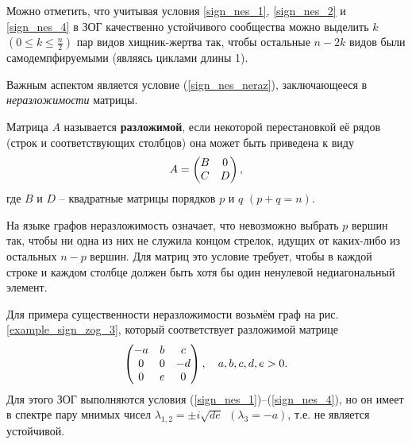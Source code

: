     Можно отметить, что учитывая условия \eqref{sign_nes_1}, \eqref{sign_nes_2} и \eqref{sign_nes_4} в ЗОГ качественно устойчивого сообщества можно выделить \(k\) \( \left( 0 \leq k \leq \frac{n}{2} \right)\) пар видов хищник-жертва так, чтобы остальные \(n - 2k\) видов были самодемпфируемыми (являясь циклами длины 1).

    Важным аспектом является условие (\ref{sign_nes_neraz}), заключающееся в \textit{неразложимости} матрицы. 

    \begin{definition}
        Матрица \(A\) называется \textbf{разложимой}, если некоторой перестановкой её рядов (строк и соответствующих столбцов) она может быть приведена к виду
        \begin{equation}
            A = \left(  \begin{matrix}
                B & 0 \\
                C & D
            \end{matrix}  \right),
        \end{equation}
        где \(B\) и \(D\) -- квадратные матрицы порядков \(p\) и \(q\) \((p+q = n)\).
    \end{definition}
    
    На языке графов неразложимость означает, что невозможно выбрать \(p\) вершин так, чтобы ни одна из них не служила концом стрелок, идущих от каких-либо из остальных \(n-p\) вершин. Для матриц это условие требует, чтобы в каждой строке и каждом столбце должен быть хотя бы один ненулевой недиагональный элемент.

    Для примера существенности неразложимости возьмём граф на рис. \ref{example_sign_zog_3}, который соответствует разложимой матрице
    \begin{equation}
        \left(  \begin{matrix}
            -a & b & c \\
            0 & 0 & -d \\
            0 & e & 0 
        \end{matrix}  \right), 
        \quad a, b, c, d, e > 0.
    \end{equation}
    Для этого ЗОГ выполняются условия (\ref{sign_nes_1})--(\ref{sign_nes_4}), но он имеет в спектре пару мнимых чисел \(\lambda_{1,2} = \pm i \sqrt{de} ~~ (\lambda_3 = -a)\), т.е. не является устойчивой.
    
